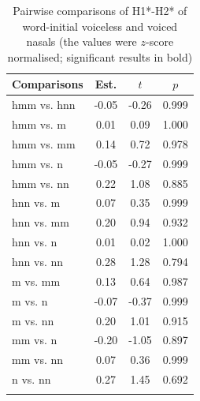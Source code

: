 \documentclass[output=paper]{langscibook}
\begin{document}
\begin{paperappendix}
\begin{table}[H]
	\begin{tabular}{l S[table-format=-1.2] S[table-format=-1.2] S[table-format=1.3]}
		\lsptoprule
		Comparisons & {Est.} & {$t$} & {$p$}\\\midrule
		hmm vs. hnn & -0.05 & -0.26 & 0.999\\
		hmm vs. m & 0.01 & 0.09 &1.000\\
		hmm vs. mm & 0.14 & 0.72 &0.978\\
		hmm vs. n & -0.05 & -0.27 &0.999\\
		hmm vs. nn & 0.22 & 1.08 &0.885\\
		hnn vs. m & 0.07 & 0.35 &0.999\\
		hnn vs. mm & 0.20 & 0.94 &0.932\\
		hnn vs. n & 0.01 & 0.02 &1.000\\
		hnn vs. nn & 0.28 & 1.28 &0.794\\
		m vs. mm & 0.13 & 0.64 &0.987\\
		m vs. n & -0.07 & -0.37 &0.999\\
		m vs. nn & 0.20 & 1.01 &0.915\\
		mm vs. n & -0.20 & -1.05 &0.897\\
		mm vs. nn & 0.07 & 0.36 &0.999\\
		n vs. nn & 0.27 & 1.45 &0.692\\
		\lspbottomrule
	\end{tabular}
	\caption{Pairwise comparisons of H1*-H2* of word-initial voiceless and voiced nasals (the values were $z$-score normalised; significant results in bold)}
	\label{tab:13:sm4}
\end{table}
\end{paperappendix}
\sloppy\printbibliography[heading=subbibliography,notkeyword=this]
\end{document}
